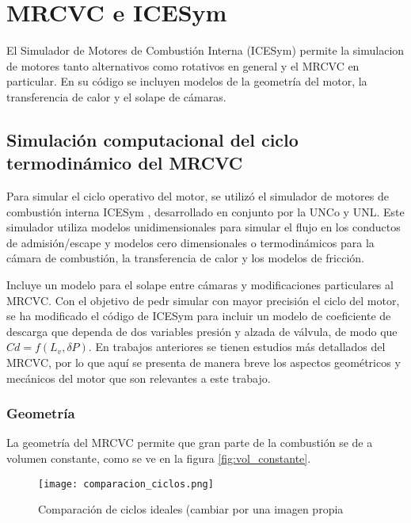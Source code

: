\chapter{MRCVC e ICESym}

El Simulador de Motores de Combustión Interna (ICESym) permite la simulacion de
motores tanto alternativos como rotativos en general y el MRCVC en particular.
%
En su código se incluyen modelos de la geometría del motor, la transferencia
de calor y el solape de cámaras.

\section{Simulación computacional del ciclo termodinámico del MRCVC}

Para simular el ciclo operativo del motor, se utilizó el simulador de motores
de combustión interna ICESym \cite{icesym}, desarrollado en conjunto por la
UNCo y UNL.
%
Este simulador utiliza modelos unidimensionales para simular el flujo en los
conductos de admisión/escape y modelos cero dimensionales o termodinámicos
para la cámara de combustión, la transferencia de calor y los modelos de
fricción.
%

Incluye un modelo para el solape entre cámaras \cite{lopez16} y modificaciones
particulares al MRCVC.
%
Con el objetivo de pedr simular con mayor precisión el ciclo del motor, se ha 
modificado el código de ICESym para incluir un modelo de coeficiente de descarga
que dependa de dos variables presión y alzada de válvula, de modo que  
$Cd = f(L_v, \delta P)$.
%
En trabajos anteriores se tienen estudios más detallados del MRCVC, por lo que
aquí se presenta de manera breve los aspectos geométricos y mecánicos del motor
que son relevantes a este trabajo.

\subsection{Geometría}
%
La geometría del MRCVC permite que gran parte de la combustión se de a volumen
constante\cite{mrcvc_geom}, como se ve en la figura \ref{fig:vol_constante}.
%

\begin{figure}
    \centering
    \texttt{[image: comparacion\_ciclos.png]}
    \caption{Comparación de ciclos ideales (cambiar por una imagen propia}
    \label{fig:comparacion_ciclos}
\end{figure}


